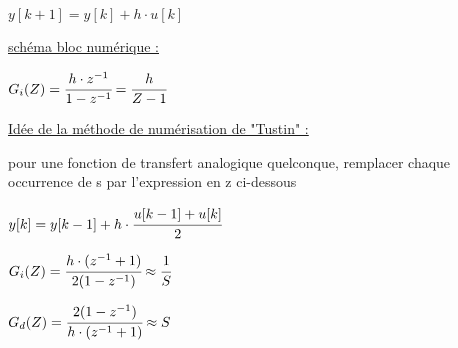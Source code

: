 \vspace{-3mm}


\vspace{3mm}
{\hfill $y[k+1] = y[k] + h \cdot u[k]$\hfill} 

\vspace{3mm}

\underline{schéma bloc numérique :}   

\begin{center}
    $G_i(Z) = \cfrac{h \cdot z^{-1}}{1 - z^{-1}}= \cfrac{h}{Z-1}$
\end{center}

\hformbar

\newpage


\underline{Idée de la méthode de numérisation de "Tustin" :}

pour une fonction de transfert analogique quelconque, 
remplacer chaque occurrence de s par l'expression en z ci-dessous

\vspace{3mm}

$y[k] = y[k-1] + h \cdot \cfrac{u[k-1]+u[k]}{2}$

\vspace{3mm}

$G_i(Z) = \cfrac{h \cdot (z^{-1}+1)}{2(1 - z^{-1})} \approx \cfrac{1}{S}$


$G_d(Z) = \cfrac{2(1 - z^{-1})}{h \cdot (z^{-1}+1)} \approx S$

